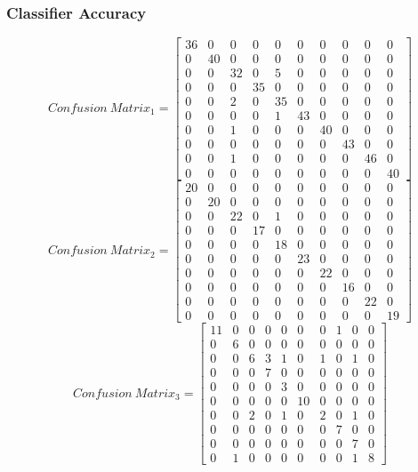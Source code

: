 \documentclass{article}
\begin{document}
			\subsubsection{Classifier Accuracy} \label{S521}
				\[
				Confusion~Matrix_{1} = 
				\begin{bmatrix}
				36& 0& 0& 0& 0 &0 & 0 & 0 & 0 & 0\\
				0& 40&  0 & 0 & 0 & 0 & 0 & 0 & 0 & 0\\
				0&  0& 32&  0&  5&  0 & 0 & 0 & 0 & 0\\
				0 & 0 & 0 &35  &0 & 0&  0&  0&  0&  0\\
				0 & 0 & 2 & 0 &35&  0 & 0 & 0 & 0 & 0\\
				0 & 0 & 0 & 0 & 1 &43&  0&  0&  0&  0\\
				0 & 0 & 1 & 0 & 0 & 0 &40&  0&  0&  0\\
				0 & 0&  0&  0&  0 & 0 & 0 &43 & 0 & 0\\
				0 & 0 & 1 & 0 & 0 & 0&  0&  0& 46 & 0\\
				0 & 0&  0&  0&  0&  0&  0&  0&  0& 40
				\end{bmatrix}
				\]
				\[
				Confusion~Matrix_{2} = 
				\begin{bmatrix}
				20&0&0&0&0&0&0&0&0&0\\
				0&20&0&0&0&0&0&0&0&0\\
				0&0&22&0&1&0&0&0&0&0\\
				0&0&0&17&0&0&0&0&0&0\\
				0&0&0&0&18&0&0&0&0&0\\
				0&0&0&0&0&23&0&0&0&0\\
				0&0&0&0&0&0&22&0&0&0\\
				0&0&0&0&0&0&0&16&0&0\\
				0&0&0&0&0&0&0&0&22&0\\
				0&0&0&0&0&0&0&0&0&19 
				\end{bmatrix}
				\]
				\[
				Confusion~Matrix_{3} = 
				\begin{bmatrix}
				11&0&0&0&0&0&0&1&0&0\\
				0&6&0&0&0&0&0&0&0&0\\
				0&0&6&3&1&0&1&0&1&0\\
				0&0&0&7&0&0&0&0&0&0\\
				0&0&0&0&3&0&0&0&0&0\\
				0&0&0&0&0&10&0&0&0&0\\
				0&0&2&0&1&0&2&0&1&0\\
				0&0&0&0&0&0&0&7&0&0\\
				0&0&0&0&0&0&0&0&7&0\\
				0&1&0&0&0&0&0&0&1&8
				\end{bmatrix}
				\]
				\linebreak
				
\end{document}
